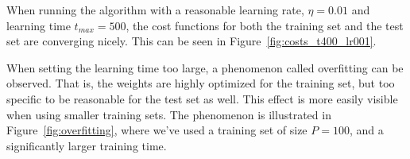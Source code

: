 When running the algorithm with a reasonable learning rate, \(\eta = 0.01\) and learning time \(t_{max} = 500\), the cost functions for both the training set and the test set are converging nicely.
This can be seen in Figure~\ref{fig:costs_t400_lr001}.

When setting the learning time too large, a phenomenon called overfitting can be observed.
That is, the weights are highly optimized for the training set, but too specific to be reasonable for the test set as well.
This effect is more easily visible when using smaller training sets.
The phenomenon is illustrated in Figure~\ref{fig:overfitting}, where we've used a training set of size \(P = 100\), and a significantly larger training time.

